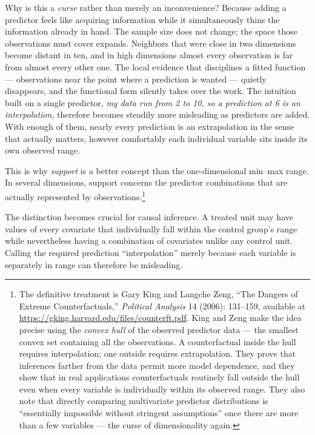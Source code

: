 \documentclass[11pt]{report}
\begin{document}
Why is this a \emph{curse} rather than merely an inconvenience? Because adding a predictor feels like acquiring information while it simultaneously thins the information already in hand. The sample size does not change; the space those observations must cover expands. Neighbors that were close in two dimensions become distant in ten, and in high dimensions almost every observation is far from almost every other one. The local evidence that disciplines a fitted function --- observations near the point where a prediction is wanted --- quietly disappears, and the functional form silently takes over the work. The intuition built on a single predictor, \emph{my data run from 2 to 10, so a prediction at 6 is an interpolation}, therefore becomes steadily more misleading as predictors are added. With enough of them, nearly every prediction is an extrapolation in the sense that actually matters, however comfortably each individual variable sits inside its own observed range.


This is why \emph{support} is a better concept than the one-dimensional min--max range. In several dimensions, support concerns the predictor combinations that are actually represented by observations.\footnote{The definitive treatment is Gary King and Langche Zeng, ``The Dangers of Extreme Counterfactuals,'' \emph{Political Analysis} 14 (2006): 131--159, available at \url{https://gking.harvard.edu/files/counterft.pdf}. King and Zeng make the idea precise using the \emph{convex hull} of the observed predictor data --- the smallest convex set containing all the observations. A counterfactual inside the hull requires interpolation; one outside requires extrapolation. They prove that inferences farther from the data permit more model dependence, and they show that in real applications counterfactuals routinely fall outside the hull even when every variable is individually within its observed range. They also note that directly comparing multivariate predictor distributions is ``essentially impossible without stringent assumptions'' once there are more than a few variables --- the curse of dimensionality again.}

The distinction becomes crucial for causal inference. A treated unit may have values of every covariate that individually fall within the control group's range while nevertheless having a combination of covariates unlike any control unit. Calling the required prediction ``interpolation'' merely because each variable is separately in range can therefore be misleading.
\end{document}
